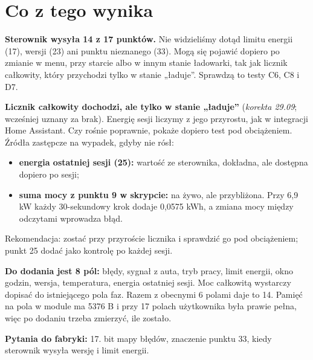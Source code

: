 \documentclass[11pt,a4paper]{article}
\begin{document}
\section{Co z tego wynika}

\textbf{Sterownik wysyła 14 z 17 punktów.} Nie widzieliśmy dotąd limitu energii (17), wersji (23) ani punktu nieznanego (33). Mogą się pojawić dopiero po zmianie w menu, przy starcie albo w innym stanie ładowarki, tak jak licznik całkowity, który przychodzi tylko w stanie „ładuje”. Sprawdzą to testy C6, C8 i D7.


\textbf{Licznik całkowity dochodzi, ale tylko w stanie „ładuje”} (\emph{korekta 29.09}; wcześniej uznany za brak). Energię sesji liczymy z jego przyrostu, jak w integracji Home Assistant. Czy rośnie poprawnie, pokaże dopiero test pod obciążeniem. Źródła zastępcze na wypadek, gdyby nie rósł:

\begin{itemize}
\item \textbf{energia ostatniej sesji (25):} wartość ze sterownika, dokładna, ale dostępna dopiero po sesji;
\item \textbf{suma mocy z punktu 9 w skrypcie:} na żywo, ale przybliżona. Przy 6,9 kW każdy 30-sekundowy krok dodaje 0,0575 kWh, a zmiana mocy między odczytami wprowadza błąd.
\end{itemize}

Rekomendacja: zostać przy przyroście licznika i sprawdzić go pod obciążeniem; punkt 25 dodać jako kontrolę po każdej sesji.


\textbf{Do dodania jest 8 pól:} błędy, sygnał z auta, tryb pracy, limit energii, okno godzin, wersja, temperatura, energia ostatniej sesji. Moc całkowitą wystarczy dopisać do istniejącego pola faz. Razem z obecnymi 6 polami daje to 14. Pamięć na pola w module ma 5376 B i przy 17 polach użytkownika była prawie pełna, więc po dodaniu trzeba zmierzyć, ile zostało.


\textbf{Pytania do fabryki:} 17. bit mapy błędów, znaczenie punktu 33, kiedy sterownik wysyła wersję i limit energii.
\end{document}
